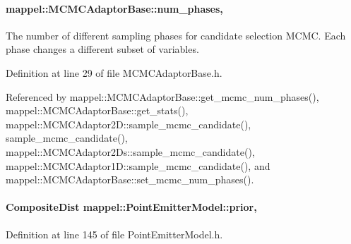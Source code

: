 \paragraph[{\texorpdfstring{num\+\_\+phases}{num_phases}}]{ mappel\+::\+M\+C\+M\+C\+Adaptor\+Base\+::num\+\_\+phases\hspace{0.3cm}{\ttfamily [protected]}, {\ttfamily [inherited]}}\hypertarget{classmappel_1_1MCMCAdaptorBase_a44b90a984ace712584074dc17831fe25}{}\label{classmappel_1_1MCMCAdaptorBase_a44b90a984ace712584074dc17831fe25}
The number of different sampling phases for candidate selection M\+C\+MC. Each phase changes a different subset of variables. 

Definition at line 29 of file M\+C\+M\+C\+Adaptor\+Base.\+h.



Referenced by mappel\+::\+M\+C\+M\+C\+Adaptor\+Base\+::get\+\_\+mcmc\+\_\+num\+\_\+phases(), mappel\+::\+M\+C\+M\+C\+Adaptor\+Base\+::get\+\_\+stats(), mappel\+::\+M\+C\+M\+C\+Adaptor2\+D\+::sample\+\_\+mcmc\+\_\+candidate(), sample\+\_\+mcmc\+\_\+candidate(), mappel\+::\+M\+C\+M\+C\+Adaptor2\+Ds\+::sample\+\_\+mcmc\+\_\+candidate(), mappel\+::\+M\+C\+M\+C\+Adaptor1\+D\+::sample\+\_\+mcmc\+\_\+candidate(), and mappel\+::\+M\+C\+M\+C\+Adaptor\+Base\+::set\+\_\+mcmc\+\_\+num\+\_\+phases().

\paragraph[{\texorpdfstring{prior}{prior}}]{\setlength{\rightskip}{0pt plus 5cm}Composite\+Dist mappel\+::\+Point\+Emitter\+Model\+::prior\hspace{0.3cm}{\ttfamily [protected]}, {\ttfamily [inherited]}}\hypertarget{classmappel_1_1PointEmitterModel_a393839f8eb1dd3d61c9369377742ba0e}{}\label{classmappel_1_1PointEmitterModel_a393839f8eb1dd3d61c9369377742ba0e}


Definition at line 145 of file Point\+Emitter\+Model.\+h.



